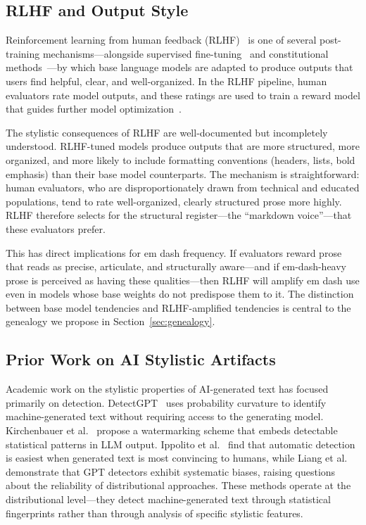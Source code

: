 \subsection{RLHF and Output Style}

Reinforcement learning from human feedback (RLHF)~\cite{ouyang2022training, christiano2017deep} is one of several post-training mechanisms---alongside supervised fine-tuning~\cite{wei2022finetuned, sanh2022multitask} and constitutional methods~\cite{bai2022training}---by which base language models are adapted to produce outputs that users find helpful, clear, and well-organized. In the RLHF pipeline, human evaluators rate model outputs, and these ratings are used to train a reward model that guides further model optimization~\cite{bai2022training, zheng2024judging}.

The stylistic consequences of RLHF are well-documented but incompletely understood. RLHF-tuned models produce outputs that are more structured, more organized, and more likely to include formatting conventions (headers, lists, bold emphasis) than their base model counterparts. The mechanism is straightforward: human evaluators, who are disproportionately drawn from technical and educated populations, tend to rate well-organized, clearly structured prose more highly. RLHF therefore selects for the structural register---the ``markdown voice''---that these evaluators prefer.

This has direct implications for em dash frequency. If evaluators reward prose that reads as precise, articulate, and structurally aware---and if em-dash-heavy prose is perceived as having these qualities---then RLHF will amplify em dash use even in models whose base weights do not predispose them to it. The distinction between base model tendencies and RLHF-amplified tendencies is central to the genealogy we propose in Section~\ref{sec:genealogy}.

\subsection{Prior Work on AI Stylistic Artifacts}

Academic work on the stylistic properties of AI-generated text has focused primarily on detection. DetectGPT~\cite{mitchell2023detectgpt} uses probability curvature to identify machine-generated text without requiring access to the generating model. Kirchenbauer et al.~\cite{kirchenbauer2023watermark} propose a watermarking scheme that embeds detectable statistical patterns in LLM output. Ippolito et al.~\cite{ippolito2020automatic} find that automatic detection is easiest when generated text is most convincing to humans, while Liang et al.~\cite{liang2023gpt} demonstrate that GPT detectors exhibit systematic biases, raising questions about the reliability of distributional approaches. These methods operate at the distributional level---they detect machine-generated text through statistical fingerprints rather than through analysis of specific stylistic features.

